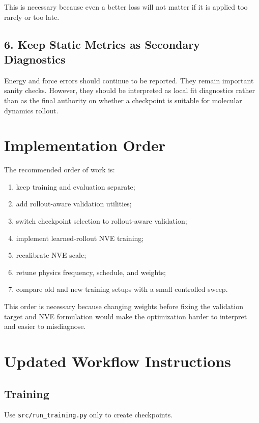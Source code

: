 \documentclass[11pt]{article}
\begin{document}
This is necessary because even a better loss will not matter if it is applied too rarely or too late.

\subsection{6. Keep Static Metrics as Secondary Diagnostics}

Energy and force errors should continue to be reported. They remain important sanity checks. However, they should be interpreted as local fit diagnostics rather than as the final authority on whether a checkpoint is suitable for molecular dynamics rollout.

\section{Implementation Order}

The recommended order of work is:

\begin{enumerate}
  \item keep training and evaluation separate;
  \item add rollout-aware validation utilities;
  \item switch checkpoint selection to rollout-aware validation;
  \item implement learned-rollout NVE training;
  \item recalibrate NVE scale;
  \item retune physics frequency, schedule, and weights;
  \item compare old and new training setups with a small controlled sweep.
\end{enumerate}

This order is necessary because changing weights before fixing the validation target and NVE formulation would make the optimization harder to interpret and easier to misdiagnose.

\section{Updated Workflow Instructions}

\subsection{Training}

Use \texttt{src/run\_training.py} only to create checkpoints.
\end{document}
